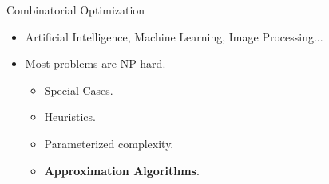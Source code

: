 \begin{frame}{Combinatorial Optimization}
\begin{itemize}[<+->]
  \item Artificial Intelligence, Machine Learning, Image Processing...
  \item Most problems are NP-hard.
	\begin{itemize}[<+->]
	  \item Special Cases.
	  \item Heuristics.
	  \item Parameterized complexity.
	  \item \textbf{Approximation Algorithms}.
	\end{itemize}
\end{itemize}
\end{frame}